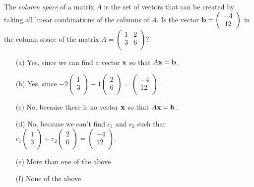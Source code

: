 \begin{problem}
    The \textit{column space} of a matrix $A$ is the set of vectors that can be created
    by taking all linear combinations of the columns of $A$.  Is the vector 
    ${\bf b}=\left( \begin{array}{c} -4\\ 12\\ \end{array} \right)$
    in the column space of the matrix
    $A=\left( \begin{array}{cc} 1 & 2\\ 3 & 6 \\ \end{array} \right)$?
\begin{enumerate}
    \item[(a)] Yes, since we can find a vector ${\bf x}$ so that $A{\bf x}={\bf b}$.
    \item[(b)] Yes, since $-2\left( \begin{array}{c} 1\\ 3\\ \end{array} \right) 
-1 \left( \begin{array}{c} 2\\ 6\\ \end{array} \right) =
\left( \begin{array}{c} -4\\ 12\\ \end{array} \right)$.
\item[(c)] No, because there is no vector ${\bf x}$ so that $A{\bf x}={\bf b}$.
\item[(d)] No, because we can't find $c_1$ and $c_2$ such that
$c_1\left( \begin{array}{c} 1\\ 3\\ \end{array} \right) 
+ c_2 \left( \begin{array}{c} 2\\ 6\\ \end{array} \right) =
\left( \begin{array}{c} -4\\ 12\\ \end{array} \right)$. 
\item[(e)] More than one of the above
\item[(f)] None of the above
\end{enumerate}
\end{problem}
% 
%             


